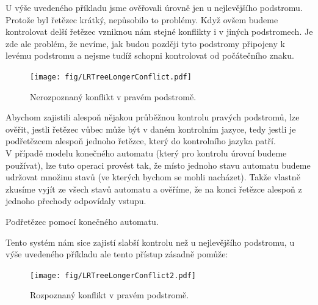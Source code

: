 U výše uvedeného příkladu jsme ověřovali úrovně jen u nejlevějšího
podstromu. Protože byl řetězec krátký, nepůsobilo to problémy.
Když ovšem budeme kontrolovat delší řetězec vzniknou nám stejné konflikty
i v jiných podstromech. Je zde ale problém, že nevíme, jak budou později
tyto podstromy připojeny k levému podstromu a nejsme tudíž schopni
kontrolovat od počátečního znaku.\\

\begin{figure}[H]
  \centering
  \texttt{[image: fig/LRTreeLongerConflict.pdf]}
  \caption{Nerozpoznaný konflikt v pravém podstromě.}
\end{figure}

Abychom zajistili alespoň nějakou průběžnou kontrolu pravých podstromů,
lze ověřit, jestli řetězec vůbec může být v daném kontrolním
jazyce, tedy jestli je podřetězcem alespoň jednoho řetězce, který do kontrolního
jazyka patří.\\

V případě modelu konečného automatu (který pro kontrolu úrovní budeme používat),
lze tuto operaci provést tak, že místo jednoho stavu automatu budeme udržovat
množinu stavů (ve kterých bychom se mohli nacházet). Takže vlastně zkusíme
vyjít ze všech stavů automatu a ověříme, že na konci řetězce alespoň z jednoho
přechody odpovídaly vstupu.\\

\begin{algorithm}[H]
  \caption{Podřetězec pomocí konečného automatu.}
  \label{alg:substr}

  \BlankLine
\end{algorithm}
\vspace{0.5cm}

Tento systém nám sice zajistí slabší kontrolu než u nejlevějšího podstromu,
u výše uvedeného příkladu ale tento přístup zásadně pomůže:

\begin{figure}[H]
  \centering
  \texttt{[image: fig/LRTreeLongerConflict2.pdf]}
  \caption{Rozpoznaný konflikt v pravém podstromě.}
\end{figure}

